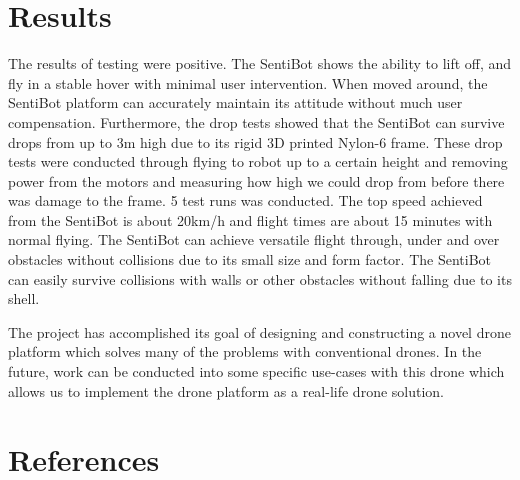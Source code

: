 \documentclass[12pt]{article}
\begin{document}
\section{Results}

The results of testing were positive. The SentiBot shows the ability to lift off, and fly in a stable hover with minimal user intervention. When moved around, the SentiBot platform can accurately maintain its attitude without much user compensation. Furthermore, the drop tests showed that the SentiBot can survive drops from up to 3m high due to its rigid 3D printed Nylon-6 frame. These drop tests were conducted through flying to robot up to a certain height and removing power from the motors and measuring how high we could drop from before there was damage to the frame. 5 test runs was conducted. The top speed achieved from the SentiBot is about 20km/h and flight times are about 15 minutes with normal flying. The SentiBot can achieve versatile flight through, under and over obstacles without collisions due to its small size and form factor. The SentiBot can easily survive collisions with walls or other obstacles without falling due to its shell.

The project has accomplished its goal of designing and constructing a novel drone platform which solves many of the problems with conventional drones. In the future, work can be conducted into some specific use-cases with this drone which allows us to implement the drone platform as a real-life drone solution.

\section{References}



\end{document}
